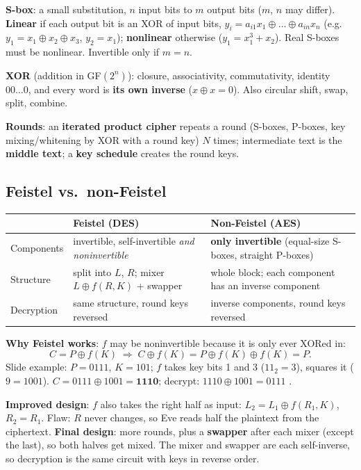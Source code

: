 \textbf{S-box}: a small substitution, $n$ input bits to $m$ output bits ($m$, $n$ may differ). \textbf{Linear} if each output bit is an XOR of input bits, $y_i = a_{i1}x_1 \oplus \dots \oplus a_{in}x_n$ (e.g.\ $y_1 = x_1 \oplus x_2 \oplus x_3$, $y_2 = x_1$); \textbf{nonlinear} otherwise ($y_1 = x_1^3 + x_2$). Real S-boxes must be nonlinear. Invertible only if $m = n$.

\textbf{XOR} (addition in GF$(2^n)$): closure, associativity, commutativity, identity $00\dots0$, and every word is \textbf{its own inverse} ($x \oplus x = 0$). Also circular shift, swap, split, combine.

\textbf{Rounds}: an \textbf{iterated product cipher} repeats a round (S-boxes, P-boxes, key mixing/whitening by XOR with a round key) $N$ times; intermediate text is the \textbf{middle text}; a \textbf{key schedule} creates the round keys.

\subsection{Feistel vs.\ non-Feistel}
\begin{center}\small
\begin{tabularx}{\textwidth}{@{}l X X@{}}
\toprule
 & \textbf{Feistel} (DES) & \textbf{Non-Feistel} (AES)\\
\midrule
Components & invertible, self-invertible \emph{and noninvertible} & \textbf{only invertible} (equal-size S-boxes, straight P-boxes)\\
Structure & split into $L$, $R$; mixer $L \oplus f(R, K)$ + swapper & whole block; each component has an inverse component\\
Decryption & same structure, round keys reversed & inverse components, round keys reversed\\
\bottomrule
\end{tabularx}
\end{center}
\textbf{Why Feistel works}: $f$ may be noninvertible because it is only ever XORed in:
\[
C = P \oplus f(K) \;\Rightarrow\; C \oplus f(K) = P \oplus f(K) \oplus f(K) = P.
\]
Slide example: $P = 0111$, $K = 101$; $f$ takes key bits 1 and 3 ($11_2 = 3$), squares it ($9 = 1001$). $C = 0111 \oplus 1001 = \mathbf{1110}$; decrypt: $1110 \oplus 1001 = 0111$ \checkmark.

\textbf{Improved design}: $f$ also takes the right half as input: $L_2 = L_1 \oplus f(R_1, K)$, $R_2 = R_1$. Flaw: $R$ never changes, so Eve reads half the plaintext from the ciphertext. \textbf{Final design}: more rounds, plus a \textbf{swapper} after each mixer (except the last), so both halves get mixed. The mixer and swapper are each self-inverse, so decryption is the same circuit with keys in reverse order.

